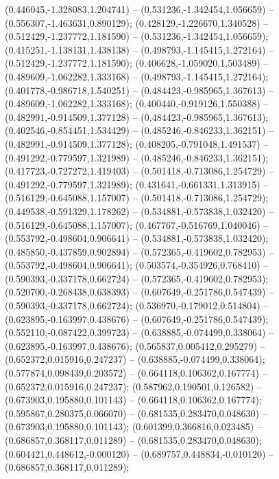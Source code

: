  (0.446045,-1.328083,1.204741) -- (0.531236,-1.342454,1.056659) -- (0.556307,-1.463631,0.890129);
 (0.428129,-1.226670,1.340528) -- (0.512429,-1.237772,1.181590) -- (0.531236,-1.342454,1.056659);
 (0.415251,-1.138131,1.438138) -- (0.498793,-1.145415,1.272164) -- (0.512429,-1.237772,1.181590);
 (0.406628,-1.059020,1.503489) -- (0.489609,-1.062282,1.333168) -- (0.498793,-1.145415,1.272164);
 (0.401778,-0.986718,1.540251) -- (0.484423,-0.985965,1.367613) -- (0.489609,-1.062282,1.333168);
 (0.400440,-0.919126,1.550388) -- (0.482991,-0.914509,1.377128) -- (0.484423,-0.985965,1.367613);
 (0.402546,-0.854451,1.534429) -- (0.485246,-0.846233,1.362151) -- (0.482991,-0.914509,1.377128);
 (0.408205,-0.791048,1.491537) -- (0.491292,-0.779597,1.321989) -- (0.485246,-0.846233,1.362151);
 (0.417723,-0.727272,1.419403) -- (0.501418,-0.713086,1.254729) -- (0.491292,-0.779597,1.321989);
 (0.431641,-0.661331,1.313915) -- (0.516129,-0.645088,1.157007) -- (0.501418,-0.713086,1.254729);
 (0.449538,-0.591329,1.178262) -- (0.534881,-0.573838,1.032420) -- (0.516129,-0.645088,1.157007);
 (0.467767,-0.516769,1.040046) -- (0.553792,-0.498604,0.906641) -- (0.534881,-0.573838,1.032420);
 (0.485850,-0.437859,0.902894) -- (0.572365,-0.419602,0.782953) -- (0.553792,-0.498604,0.906641);
 (0.503574,-0.354926,0.768410) -- (0.590393,-0.337178,0.662724) -- (0.572365,-0.419602,0.782953);
 (0.520700,-0.268438,0.638393) -- (0.607649,-0.251786,0.547439) -- (0.590393,-0.337178,0.662724);
 (0.536970,-0.179012,0.514804) -- (0.623895,-0.163997,0.438676) -- (0.607649,-0.251786,0.547439);
 (0.552110,-0.087422,0.399723) -- (0.638885,-0.074499,0.338064) -- (0.623895,-0.163997,0.438676);
 (0.565837,0.005412,0.295279) -- (0.652372,0.015916,0.247237) -- (0.638885,-0.074499,0.338064);
 (0.577874,0.098439,0.203572) -- (0.664118,0.106362,0.167774) -- (0.652372,0.015916,0.247237);
 (0.587962,0.190501,0.126582) -- (0.673903,0.195880,0.101143) -- (0.664118,0.106362,0.167774);
 (0.595867,0.280375,0.066070) -- (0.681535,0.283470,0.048630) -- (0.673903,0.195880,0.101143);
 (0.601399,0.366816,0.023485) -- (0.686857,0.368117,0.011289) -- (0.681535,0.283470,0.048630);
 (0.604421,0.448612,-0.000120) -- (0.689757,0.448834,-0.010120) -- (0.686857,0.368117,0.011289);
